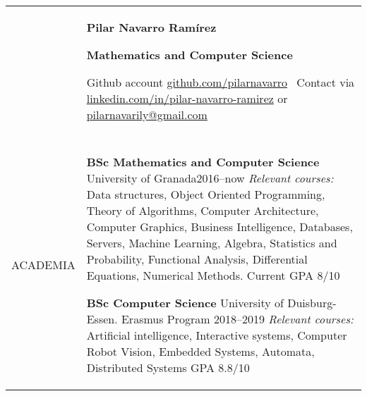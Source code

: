 \documentclass[letterpaper,10pt,oneside]{article}
\newcommand{\DatestampY}[1]{#1}
\newenvironment{body}
{\par\par
\begin{longtable}{p{0.125\textwidth}p{0.84\textwidth}}}
{\par\end{longtable}\par}
\renewcommand{\section}[3]{\\[-0.7cm]\pdfbookmark[2]{#2}{#3}\\%
\raggedleft  %
{\fontsize{9.5pt}{9.5pt}\selectfont\bfseries\raggedright%
\MakeUppercase{#1}}&}
\newcommand{\SmallEntryGap}{\par\vspace{0.38em}\par}
\newcommand{\roundpic}[4][]{
\tikz\node [circle, minimum width = #2,
path picture = {
\node [#1] at (path picture bounding box.center) {
\texttt{[image: \#4]}};
}] {};}
\begin{document}
\begin{body}
	
	&
	\vspace{-2.45cm} \par
	\huge{\textbf{Pilar Navarro Ramírez}} \par
	\large{\textbf{Mathematics and Computer Science}} \par
	\normalsize{Github account \href{https://github.com/pilarnavarro}{github.com/pilarnavarro} \textemdash\ Contact via  \href{https://www.linkedin.com/in/pilar-navarro-ramirez/} {linkedin.com/in/pilar-navarro-ramirez} or \href{pilarnavarily@gmail.com} {pilarnavarily@gmail.com}}
	\vspace{0.1cm}
	
	
	
	
	\section{Academia}{Academia}{PDF:Academia}
	
	\textbf{BSc Mathematics and Computer Science} University of Granada\hfill \DatestampY{2016}--\DatestampY{now} \newline
	\textit{Relevant courses:} Data structures, Object Oriented Programming, Theory of Algorithms, Computer Architecture, Computer Graphics, Business Intelligence, Databases, Servers, Machine Learning, Algebra, Statistics and Probability, Functional Analysis, Differential Equations, Numerical Methods. \newline
	Current GPA 8/10
	
	\textbf{BSc Computer Science} University of Duisburg-Essen. Erasmus Program \hfill \DatestampY{2018}--\DatestampY{2019} \newline
	\textit{Relevant courses:} Artificial intelligence, Interactive systems, Computer Robot Vision, Embedded Systems, Automata, Distributed Systems \newline
	GPA 8.8/10
	

\end{body}
\end{document}

